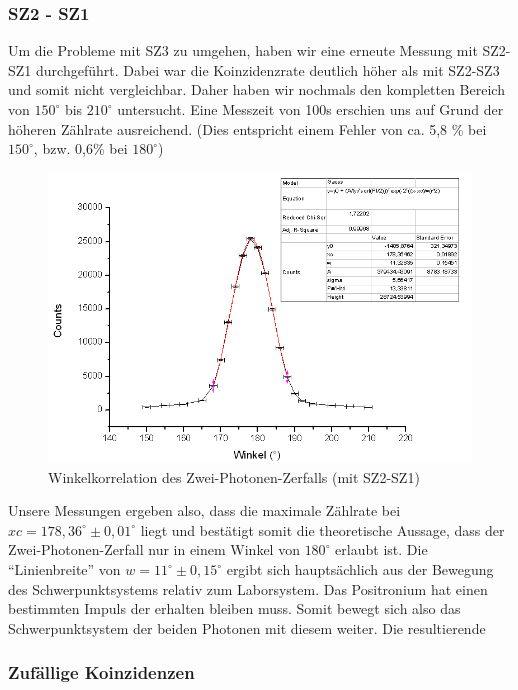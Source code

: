 
\subsubsection{SZ2 - SZ1}

Um die Probleme mit SZ3 zu umgehen, haben wir eine erneute Messung mit SZ2-SZ1 durchgeführt. Dabei war die Koinzidenzrate deutlich höher als mit SZ2-SZ3 und somit nicht vergleichbar. Daher haben wir nochmals den kompletten Bereich von $150^\circ$ bis $210^\circ$ untersucht. Eine Messzeit von 100s erschien uns auf Grund der höheren Zählrate ausreichend. (Dies entspricht einem Fehler von ca. 5,8 \% bei $150^\circ$, bzw. 0,6\% bei $180^\circ$)

\begin{figure}
 \includegraphics[width=\textwidth]{Graphen/180K.png}
 \caption{Winkelkorrelation des Zwei-Photonen-Zerfalls (mit SZ2-SZ1)}
\end{figure}

Unsere Messungen ergeben also, dass die maximale Zählrate bei $xc = 178,36^\circ \pm 0,01^\circ$ liegt und bestätigt somit die theoretische Aussage, dass der Zwei-Photonen-Zerfall nur in einem Winkel von $180^\circ$ erlaubt ist. Die "`Linienbreite"' von $w = 11^\circ \pm 0,15^\circ$ ergibt sich hauptsächlich aus der Bewegung des Schwerpunktsystems relativ zum Laborsystem. Das Positronium hat einen bestimmten Impuls der erhalten bleiben muss. Somit bewegt sich also das Schwerpunktsystem der beiden Photonen mit diesem weiter. Die resultierende 

\subsubsection{Zufällige Koinzidenzen}

